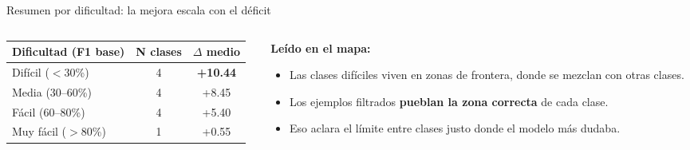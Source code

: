 \begin{frame}{Resumen por dificultad: la mejora escala con el déficit}
\begin{columns}[T]

\begin{column}{0.50\textwidth}
\centering
\scriptsize
\renewcommand{\arraystretch}{1.05}
\begin{tabular}{@{}lcc@{}}
\toprule
\textbf{Dificultad (F1 base)} & \textbf{N clases} & \textbf{$\Delta$ medio} \\
\midrule
\rowcolor{uaiorange!18} Difícil ($<$30\%)        & 4 & \alert{\textbf{+10.44}} \\
\rowcolor{uaiorange!8}  Media (30--60\%)         & 4 & +8.45 \\
                        Fácil (60--80\%)         & 4 & +5.40 \\
\rowcolor{methodSMOTE!10} Muy fácil ($>$80\%)   & 1 & +0.55 \\
\bottomrule
\end{tabular}

\vspace{0.6em}
\end{column}

\begin{column}{0.50\textwidth}
\small
\textbf{Leído en el mapa:}
\begin{itemize}\setlength\itemsep{1pt}\scriptsize
  \item Las clases difíciles viven en \alert{zonas de frontera}, donde se mezclan con otras clases.
  \item Los ejemplos filtrados \textbf{pueblan la zona correcta} de cada clase.
  \item Eso aclara el límite entre clases justo donde el modelo más dudaba.
\end{itemize}


\end{column}
\end{columns}
\end{frame}
